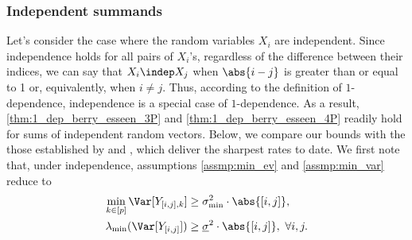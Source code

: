 \documentclass[aos]{imsart}
\begin{document}
\subsubsection{Independent summands} \label{sec:comparison_indep}
Let's consider the case where the random variables $X_i$ are independent. Since independence holds for all pairs of $X_i$'s, regardless of the difference between their indices, we can say that $X_i \indep X_j$ when $\abs{i-j}$ is greater than or equal to 1 or, equivalently, when $i \neq j$. Thus, according to the definition of $1$-dependence, independence is a special case of $1$-dependence. As a result, \cref{thm:1_dep_berry_esseen_3P} and \cref{thm:1_dep_berry_esseen_4P} readily hold for sums of independent random vectors. Below, we compare our bounds with the those established by  and \citet{koike.degenerate}, which deliver the sharpest rates to date. %
We first note that, under independence, assumptions \eqref{assmp:min_ev} and \eqref{assmp:min_var} reduce to
\begin{equation*}
\begin{aligned}
\min_{k \in [p]} \Var[Y_{[i,j],k}] & \geq \sigma^2_{\min} \cdot \abs{[i,j]}, \\
\lambda_{\min}(\Var[Y_{[i,j]}]) & \geq \underline{\sigma}^2 \cdot \abs{[i,j]}, ~\forall i, j.\\
\end{aligned}
\end{equation*}
\end{document}
